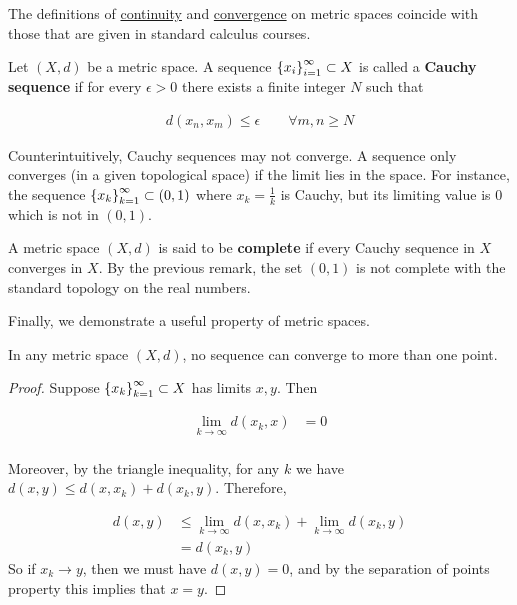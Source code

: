 \begin{remark}
  The definitions of \hyperref[def:continuity]{continuity} and
  \hyperref[def:convergence]{convergence} on metric spaces coincide
  with those that are given in standard calculus courses.
\end{remark}

\begin{definition}
  Let $(X, d)$ be a metric space. A sequence
  $\indexedint{i}{\infty}{x}\subset X$ is called a \textbf{Cauchy
    sequence} if for every $\epsilon>0$ there exists a finite integer
  $N$ such that

  \begin{align*}
    d(x_n, x_m)\leq\epsilon\qquad\forall m,n\geq N
  \end{align*}
\end{definition}

\begin{remark}
  Counterintuitively, Cauchy sequences may not converge. A sequence
  only converges (in a given topological space) if the limit lies in
  the space. For instance, the sequence
  $\indexedint{k}{\infty}{x}\subset (0,1)$ where $x_k=\frac{1}{k}$ is
  Cauchy, but its limiting value is $0$ which is not in $(0,1)$.
\end{remark}

\begin{definition}\label{def:complete}
  A metric space $(X, d)$ is said to be \textbf{complete} if every
  Cauchy sequence in $X$ converges in $X$. By the previous remark, the
  set $(0,1)$ is not complete with the standard topology on the real numbers.
\end{definition}

Finally, we demonstrate a useful property of metric spaces.

\begin{lemma}\label{lem:metric:convergence}
  In any metric space $(X, d)$, no sequence can converge to more than
  one point.
\end{lemma}
\begin{proof}
  Suppose $\indexedint{k}{\infty}{x}\subset X$ has limits $x, y$. Then

  \begin{align*}
    \lim_{k\to\infty}d(x_k, x) &= 0\\
  \end{align*}

  Moreover, by the triangle inequality, for any $k$ we have $d(x,
  y)\leq d(x, x_k) + d(x_k, y)$. Therefore,

  \begin{align*}
    d(x, y) &\leq \lim_{k\to\infty}d(x, x_k) + \lim_{k\to\infty}d(x_k,
              y)\\
    &= d(x_k, y)
  \end{align*}
  So if $x_k\to y$, then we must have $d(x, y) = 0$, and by the
  separation of points property this implies that $x=y$.
\end{proof}
